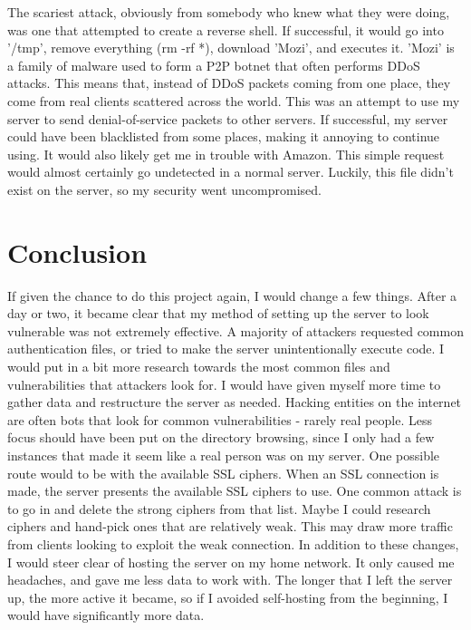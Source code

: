 \documentclass[12pt]{article}
\begin{document}
The scariest attack, obviously from somebody who knew what they were doing, was one that attempted to create a reverse shell.
If successful, it would go into '/tmp', remove everything (rm -rf *), download 'Mozi', and executes it.
'Mozi' is a family of malware used to form a P2P botnet that often performs DDoS attacks.
This means that, instead of DDoS packets coming from one place, they come from real clients scattered across the world.
This was an attempt to use my server to send denial-of-service packets to other servers.
If successful, my server could have been blacklisted from some places, making it annoying to continue using.
It would also likely get me in trouble with Amazon.
This simple request would almost certainly go undetected in a normal server.
Luckily, this file didn't exist on the server, so my security went uncompromised.

\section{Conclusion}
If given the chance to do this project again, I would change a few things.
After a day or two, it became clear that my method of setting up the server to look vulnerable was not extremely effective.
A majority of attackers requested common authentication files, or tried to make the server unintentionally execute code.
I would put in a bit more research towards the most common files and vulnerabilities that attackers look for.
I would have given myself more time to gather data and restructure the server as needed.
Hacking entities on the internet are often bots that look for common vulnerabilities - rarely real people.
Less focus should have been put on the directory browsing, since I only had a few instances that made it seem like a real person was on my server.
One possible route would to be with the available SSL ciphers.
When an SSL connection is made, the server presents the available SSL ciphers to use.
One common attack is to go in and delete the strong ciphers from that list.
Maybe I could research ciphers and hand-pick ones that are relatively weak.
This may draw more traffic from clients looking to exploit the weak connection.
In addition to these changes, I would steer clear of hosting the server on my home network.
It only caused me headaches, and gave me less data to work with.
The longer that I left the server up, the more active it became, so if I avoided self-hosting from the beginning, I would have significantly more data.
\end{document}
